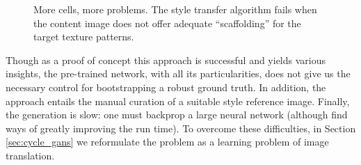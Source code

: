 \begin{figure}%
    \centering
    \qquad
    \qquad
    \caption{More cells, more problems. The style transfer algorithm fails when the content image does not offer adequate ``scaffolding'' for the target texture patterns.}%
    \label{fig:style_transfer_cells_many}%
\end{figure}

Though as a proof of concept this approach is successful and yields various insights, the pre-trained network, with all its particularities, does not give us the necessary control for bootstrapping a robust ground truth. In addition, the approach entails the manual curation of a suitable style reference image. Finally, the generation is slow: one must backprop a large neural network (although \cite{johnson2016perceptual} find ways of greatly improving the run time). To overcome these difficulties, in Section \ref{sec:cycle_gans} we reformulate the problem as a learning problem of image translation.


